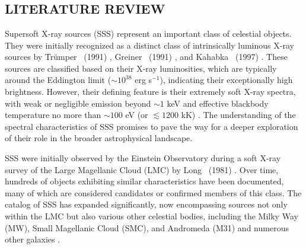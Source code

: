 \chapter{\MakeUppercase{\ChapterTitleThree}} \label{chap:multi-obs}
    \minitoc
    
    
    \setcounter{footnote}{\value{footnotecount}}
    
    \newpage
    \section{\MakeUppercase{Literature Review}} \label{multi-obs:lit-rev}
    	Supersoft X-ray sources (SSS) represent an important class of celestial objects. They were initially recognized as a distinct class of intrinsically luminous X-ray sources by Trümper \etal\ (1991) \cite{trumper1991x}, Greiner \etal\ (1991) \cite{greiner1991rosat}, and Kahabka \etal\ (1997) \cite{kahabka97}. These sources are classified based on their X-ray luminosities, which are typically around the Eddington limit ($\sim 10^{38}$ erg s$^{-1}$), indicating their exceptionally high brightness. However, their defining feature is their extremely soft X-ray spectra, with weak or negligible emission beyond $\sim 1$ keV and effective blackbody temperature no more than $\sim 100$ eV (or $\lesssim 1200$ kK) \cite{kahabka06}. The understanding of the spectral characteristics of SSS promises to pave the way for a deeper exploration of their role in the broader astrophysical landscape.
    	
    	SSS were initially observed by the Einstein Observatory during a soft X-ray survey of the Large Magellanic Cloud (LMC) by Long \etal\ (1981) \cite{long81}. Over time, hundreds of objects exhibiting similar characteristics have been documented, many of which are considered candidates or confirmed members of this class. The catalog of SSS has expanded significantly, now encompassing sources not only within the LMC but also various other celestial bodies, including the Milky Way (MW), Small Magellanic Cloud (SMC), and Andromeda (M31) and numerous other galaxies \cite{kahabkatrumper1996,steinerdiaz1998,greiner2000,pietsch2003deep,di2003luminous,orio2010census,henze2010recent,sturm2012new,galiullin2021populations}.
    	
